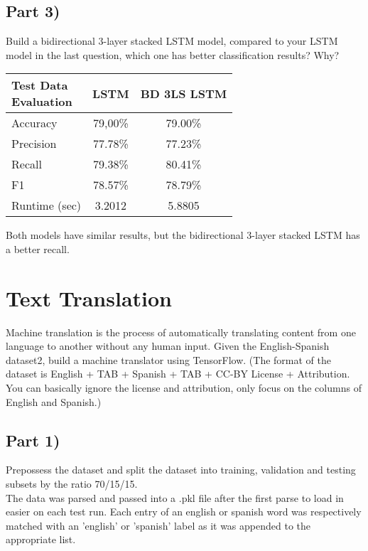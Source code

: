 \documentclass[conference]{IEEEtran}
\begin{document}
\subsection{Part 3)}
\par \noindent Build a bidirectional 3-layer stacked LSTM model, compared to your LSTM model in the last question, which one has better classification results? Why?
\begin{table}[H]
    \centering
    \begin{tabular}{|l|c|c|}
        \hline
        \makecell{Test Data\\ Evaluation} & LSTM & BD 3LS LSTM \\
        \hline
        Accuracy  	  & 79,00\% & 79.00\% \\
        Precision 	  & 77.78\% & 77.23\% \\
        Recall        & 79.38\% & 80.41\% \\
        F1       	  & 78.57\% & 78.79\% \\
        Runtime (sec) & 3.2012  & 5.8805 \\
        \hline
    \end{tabular}
\end{table}
Both models have similar results, but the bidirectional 3-layer stacked LSTM has a better recall.
\newpage
\section{Text Translation}
\par \noindent Machine translation is the process of automatically translating content from one language to another without any human input. Given the English-Spanish dataset2, build a machine translator using TensorFlow. (The format of the dataset is English + TAB + Spanish + TAB + CC-BY License + Attribution. You can basically ignore the license and attribution, only focus on the columns of English and Spanish.)
\subsection{Part 1)}
\par \noindent Prepossess the dataset and split the dataset into training, validation and testing subsets by the ratio 70/15/15.\\

The data was parsed and passed into a .pkl file after the first parse to load in easier on each test run. Each entry of an english or spanish word was respectively matched with an 'english' or 'spanish' label as it was appended to the appropriate list.
\end{document}

